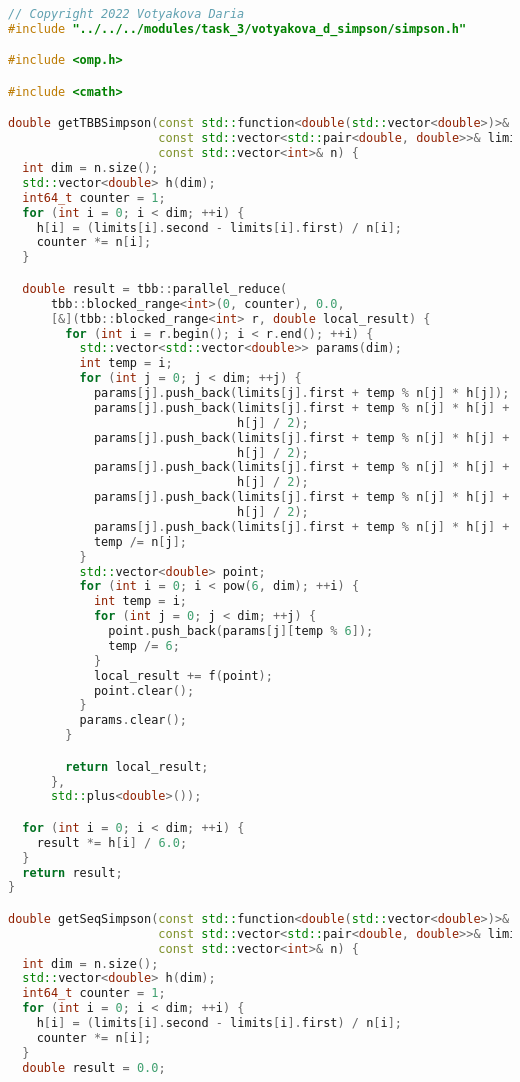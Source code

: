 \documentclass{report}
\begin{document}
\begin{lstlisting}[language=C++]
// Copyright 2022 Votyakova Daria
#include "../../../modules/task_3/votyakova_d_simpson/simpson.h"

#include <omp.h>

#include <cmath>

double getTBBSimpson(const std::function<double(std::vector<double>)>& f,
                     const std::vector<std::pair<double, double>>& limits,
                     const std::vector<int>& n) {
  int dim = n.size();
  std::vector<double> h(dim);
  int64_t counter = 1;
  for (int i = 0; i < dim; ++i) {
    h[i] = (limits[i].second - limits[i].first) / n[i];
    counter *= n[i];
  }

  double result = tbb::parallel_reduce(
      tbb::blocked_range<int>(0, counter), 0.0,
      [&](tbb::blocked_range<int> r, double local_result) {
        for (int i = r.begin(); i < r.end(); ++i) {
          std::vector<std::vector<double>> params(dim);
          int temp = i;
          for (int j = 0; j < dim; ++j) {
            params[j].push_back(limits[j].first + temp % n[j] * h[j]);
            params[j].push_back(limits[j].first + temp % n[j] * h[j] +
                                h[j] / 2);
            params[j].push_back(limits[j].first + temp % n[j] * h[j] +
                                h[j] / 2);
            params[j].push_back(limits[j].first + temp % n[j] * h[j] +
                                h[j] / 2);
            params[j].push_back(limits[j].first + temp % n[j] * h[j] +
                                h[j] / 2);
            params[j].push_back(limits[j].first + temp % n[j] * h[j] + h[j]);
            temp /= n[j];
          }
          std::vector<double> point;
          for (int i = 0; i < pow(6, dim); ++i) {
            int temp = i;
            for (int j = 0; j < dim; ++j) {
              point.push_back(params[j][temp % 6]);
              temp /= 6;
            }
            local_result += f(point);
            point.clear();
          }
          params.clear();
        }

        return local_result;
      },
      std::plus<double>());

  for (int i = 0; i < dim; ++i) {
    result *= h[i] / 6.0;
  }
  return result;
}

double getSeqSimpson(const std::function<double(std::vector<double>)>& f,
                     const std::vector<std::pair<double, double>>& limits,
                     const std::vector<int>& n) {
  int dim = n.size();
  std::vector<double> h(dim);
  int64_t counter = 1;
  for (int i = 0; i < dim; ++i) {
    h[i] = (limits[i].second - limits[i].first) / n[i];
    counter *= n[i];
  }
  double result = 0.0;


\end{lstlisting}
\end{document}
